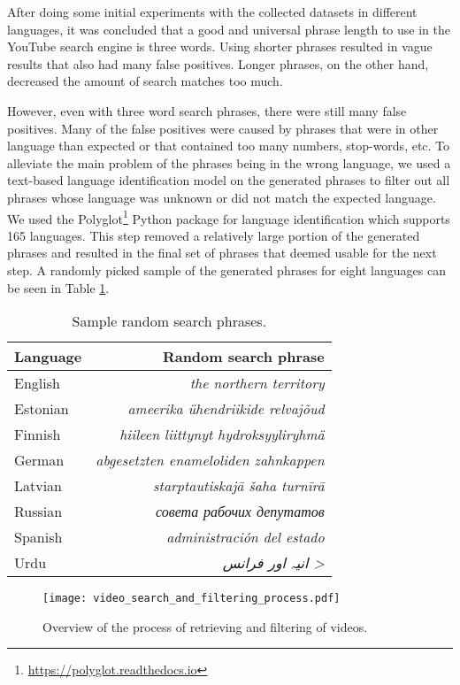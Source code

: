 \documentclass{article}
\begin{document}
After doing some initial experiments with the collected datasets in different languages,
it was concluded that a good and universal phrase length to use in the YouTube search
engine is three words. Using shorter phrases resulted in vague results that also had
many false positives. Longer phrases, on the other hand, decreased the amount of search matches too much.

However, even with three word search phrases, there were still many false positives.
Many of the false positives were caused by phrases that were in other language than expected or that contained too many
numbers, stop-words, etc. To alleviate the main problem of the phrases being in the
wrong language, we used a 
text-based language identification model on the generated phrases to filter out
all phrases whose language was unknown or did not match the expected language.
We used the Polyglot\footnote{\url{https://polyglot.readthedocs.io}} Python package 
for language identification which supports 165 languages. 
This step removed a relatively large portion of the generated phrases and resulted in  the final set of
phrases that deemed usable for the next step. A randomly picked sample of the generated
phrases for eight languages can be seen in Table \ref{tab:example-phrases}.

\begin{table}[tbh]
\caption{Sample random search phrases.}
\label{tab:example-phrases}
\centering
\begin{tabular}{lr}
Language & Random search phrase \\
\hline
English  & \textit{the northern territory} \\
Estonian & \textit{ameerika ühendriikide relvajõud} \\
Finnish  & \textit{hiileen liittynyt hydroksyyliryhmä} \\
German   & \textit{abgesetzten enameloliden zahnkappen} \\
Latvian  & \textit{starptautiskajā šaha turnīrā} \\
Russian  & \textit{\foreignlanguage{russian}{совета рабочих депутатов}} \\
Spanish  & \textit{administración del estado} \\
Urdu     & \textit{\<انیہ اور فرانس >} \\
\hline
\end{tabular}
\end{table}

\begin{figure}[t]
  \centering
  \texttt{[image: video\_search\_and\_filtering\_process.pdf]}
  \caption{Overview of the process of retrieving and filtering of videos.}
  \label{fig:youtube}
\end{figure}
\end{document}
